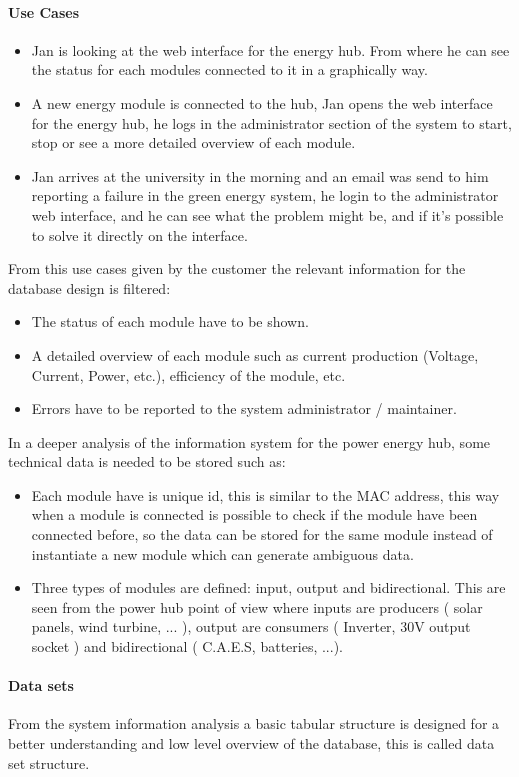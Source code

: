 \paragraph{Use Cases}
	\begin{itemize}
		\item Jan is looking at the web interface for the energy hub. From where he can see the status for each modules connected to it
in a graphically way.
		\item A new energy module is connected to the hub, Jan opens the web interface for the energy hub, he logs in the administrator section of the system
to start, stop or see a more detailed overview of each module.
		\item Jan arrives at the university in the morning and an email was send to him reporting a failure in the green energy system, he login to the administrator web interface, and he can see what the problem might be, and if it's possible to solve it directly on the interface.
	\end{itemize}
From this use cases given by the customer the relevant information for the database design is filtered:
	\begin{itemize}
		\item The status of each module have to be shown.
		\item A detailed overview of each module such as current production (Voltage, Current, Power, etc.), efficiency of the module, etc.
		\item Errors have to be reported to the system administrator / maintainer.
	\end{itemize}
In a deeper analysis of the information system for the power energy hub, some technical data is needed to be stored such as:
	\begin{itemize}
		\item Each module have is unique id, this is similar to the MAC address, this way when a module is connected is possible to check if the module have been connected before, so the data can be stored for the same module instead of instantiate a new module which can generate ambiguous data.
		\item Three types of modules are defined: input, output and bidirectional. This are seen from the power hub point of view where inputs are producers ( solar panels, wind turbine, ... ), output are consumers ( Inverter, 30V output socket ) and bidirectional ( C.A.E.S, batteries, ...).
	\end{itemize}

\paragraph{Data sets}
From the system information analysis a basic tabular structure is designed for a better understanding and low level overview of the database, this is called data set structure.
\\\\

